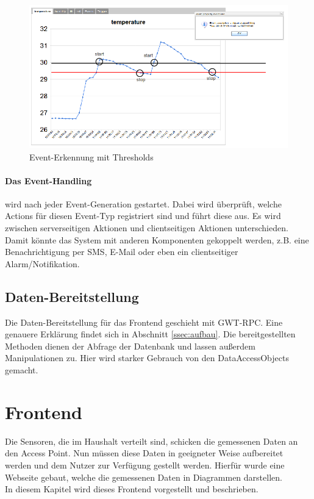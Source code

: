 \documentclass[12pt,a4paper,twoside]{article}
\begin{document}
\begin{figure}[htbp]
   \centering
   \includegraphics[width=12cm]{fig/threshold.png}
   \caption{Event-Erkennung mit Thresholds}
   \label{event-detection}
\end{figure}

\paragraph{Das Event-Handling} wird nach jeder Event-Generation gestartet. Dabei wird überprüft, welche Actions für diesen Event-Typ registriert sind und führt diese aus. Es wird zwischen serverseitigen Aktionen und clientseitigen Aktionen unterschieden. Damit könnte das System mit anderen Komponenten gekoppelt werden, z.B. eine Benachrichtigung per SMS, E-Mail oder eben ein clientseitiger Alarm/Notifikation.

\subsection{Daten-Bereitstellung}Die Daten-Bereitstellung für das Frontend geschieht mit GWT-RPC. Eine genauere Erklärung findet sich in Abschnitt \ref{ssec:aufbau}. Die bereitgestellten Methoden dienen der Abfrage der Datenbank und lassen außerdem Manipulationen zu. Hier wird starker Gebrauch von den DataAccessObjects gemacht. 


\section{Frontend}\label{sec:frontend}
Die Sensoren, die im Haushalt verteilt sind, schicken die gemessenen Daten an den Access Point. Nun müssen diese Daten in geeigneter Weise aufbereitet werden und dem Nutzer zur Verfügung gestellt werden. Hierfür wurde eine Webseite gebaut, welche die gemessenen Daten in Diagrammen darstellen. \\
In diesem Kapitel wird dieses Frontend vorgestellt und beschrieben.
\end{document}

